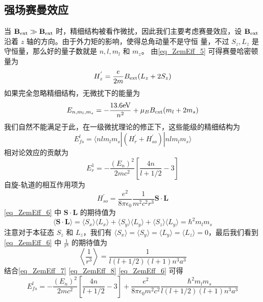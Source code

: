 \subsection{强场赛曼效应}
当 $\mathbf{B}_{\rm{ext}}\gg \mathbf{B}_{\rm{ext}}$ 时，精细结构被看作微扰，因此我们主要考虑赛曼效应，设 $\mathbf{B}_{\rm{ext}}$ 沿着 $z$ 轴的方向。由于外力矩的影响，使得总角动量不是守恒
量，不过 $S_z,L_z$ 是守恒量，那么好的量子数就是 $n,l,m_l$ 和 $m_z$。 由\autoref{eq_ZemEff_5} 可得赛曼哈密顿量为
\begin{equation}\label{eq_ZemEff_12}
H_z^{'} = \frac{e}{2m}B_{\rm{ext}}(L_z+2S_z)
\end{equation}
如果完全忽略精细结构，无微扰下的能量为
\begin{equation}\label{eq_ZemEff_7}
E_{n,m_l,m_s}=-\frac{13.6\rm{eV}}{n^2}+\mu_B B_{\rm{ext}}(m_l+2m_s)
\end{equation}
我们自然不能满足于此，在一级微扰理论的修正下，这些能级的精细结构为
\begin{equation}\label{eq_ZemEff_8}
E_{fs}^l=\langle nlm_lm_s|(H^{'}_r+H^{'}_{so})|nlm_lm_s\rangle
\end{equation}
相对论效应的贡献为
\begin{equation}\label{eq_ZemEff_6}
E_r^1=-\frac{(E_n)^2}{2mc^2}\left[\frac{4n}{l+1/2}-3\right]
\end{equation}
自旋-轨道的相互作用项为
\begin{equation}
H^{'}_{so}=\frac{e^2}{8\pi\epsilon_0}\frac{1}{m^2c^2r^3}\mathbf{S\cdot L}
\end{equation}
\autoref{eq_ZemEff_6} 中 $\mathbf{S\cdot L}$ 的期待值为
\begin{equation}
\langle \mathbf{S\cdot L} \rangle=\langle S_x\rangle\langle L_x\rangle+\langle S_y\rangle\langle L_y\rangle+\langle S_z\rangle\langle L_y\rangle=\hbar^2
m_lm_s\end{equation}
注意对于本征态 $S_z$ 和 $L_z$，我们有 $\langle S_x\rangle=\langle S_y\rangle=\langle L_y\rangle=\langle L_z\rangle=0$，最后我们看到\autoref{eq_ZemEff_6} 中 $\frac{1}{r^3}$ 的期待值为
\begin{equation}\label{eq_ZemEff_11}
\left\langle\frac{1}{r^3}\right\rangle=\frac{1}{l(l+1/2)(l+1)n^3a^3}
\end{equation}
结合\autoref{eq_ZemEff_7} \autoref{eq_ZemEff_8} \autoref{eq_ZemEff_6} 可得
\begin{equation}\label{eq_ZemEff_9}
E_{fs}^l= -\frac{(E_n)^2}{2mc^2}\left[\frac{4n}{l+1/2}-3\right]+\frac{e^2}{8\pi\epsilon_0m^2c^2}\frac{\hbar^2
m_lm_s}{l(l+1/2)(l+1)n^3a^3}
\end{equation}
